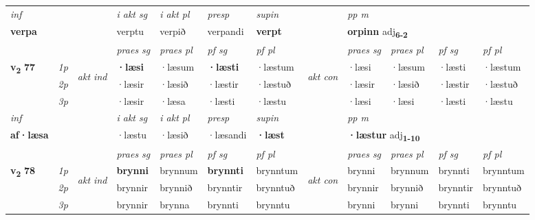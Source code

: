 \begin{longtable}[l]{X>{\footnotesize\itshape}llXXXXlXXXX}
   {\textit{inf}} & &  & \textit{i akt sg} & \textit{i akt pl}   & \textit{presp} & \textit{supin}  && \textit{pp m} \\*
  {\textbf{verpa}} & && verptu  & verpið   & verpandi &  \textbf{verpt}  && \multicolumn{2}{l}{\textbf{orpinn} adj\textbf{\textsubscript{6-2}}} \\*

\midrule

 & &   & \textit{praes sg}  & \textit{praes pl}    & \textit{ pf sg} & \textit{pf pl} & & \textit{praes sg}  & \textit{praes pl}    & \textit{pf sg} & \textit{pf pl }  \\ \cmidrule{4-7} \cmidrule{9-12}
 \multirow{2}{*}{{{\textbf{v{\textsubscript{2}}} \Large{\textbf{77}}}}}  & 1p & \multirow{3}{*}{\begin{turn}{90}\textit{akt ind}\end{turn}} & \textbf{·læsi} & ·læsum & \textbf{·læsti} & ·læstum & \multirow{3}{*}{\begin{turn}{90}\textit{akt con}\end{turn}} &·læsi & ·læsum & ·læsti & ·læstum\\*
 & 2p &  &  ·læsir  & ·læsið & ·læstir & ·læstuð & & ·læsir & ·læsið & ·læstir & ·læstuð \\*
 & 3p &  & ·læsir & ·læsa & ·læsti & ·læstu & & ·læsi & ·læsi& ·læsti & ·læstu \\*
\cmidrule{4-7} \cmidrule{9-12}

   {\textit{inf}} & &  & \textit{i akt sg} & \textit{i akt pl}   & \textit{presp} & \textit{supin}  && \textit{pp m} \\*
  {\textbf{af\allowbreak ·læsa}} & && ·læstu  & ·læsið   & ·læsandi &  \textbf{·læst}  && \multicolumn{2}{l}{\textbf{·læstur} adj\textbf{\textsubscript{1-10}}} \\*

\midrule

 & &   & \textit{praes sg}  & \textit{praes pl}    & \textit{ pf sg} & \textit{pf pl} & & \textit{praes sg}  & \textit{praes pl}    & \textit{pf sg} & \textit{pf pl }  \\ \cmidrule{4-7} \cmidrule{9-12}
 \multirow{2}{*}{{{\textbf{v{\textsubscript{2}}} \Large{\textbf{78}}}}}  & 1p & \multirow{3}{*}{\begin{turn}{90}\textit{akt ind}\end{turn}} & \textbf{brynni} & brynnum & \textbf{brynnti} & brynntum & \multirow{3}{*}{\begin{turn}{90}\textit{akt con}\end{turn}} &brynni & brynnum & brynnti & brynntum\\*
 & 2p &  &  brynnir  & brynnið & brynntir & brynntuð & & brynnir & brynnið & brynntir & brynntuð \\*
 & 3p &  & brynnir & brynna & brynnti & brynntu & & brynni & brynni& brynnti & brynntu \\*
\cmidrule{4-7} \cmidrule{9-12}


\end{longtable}

